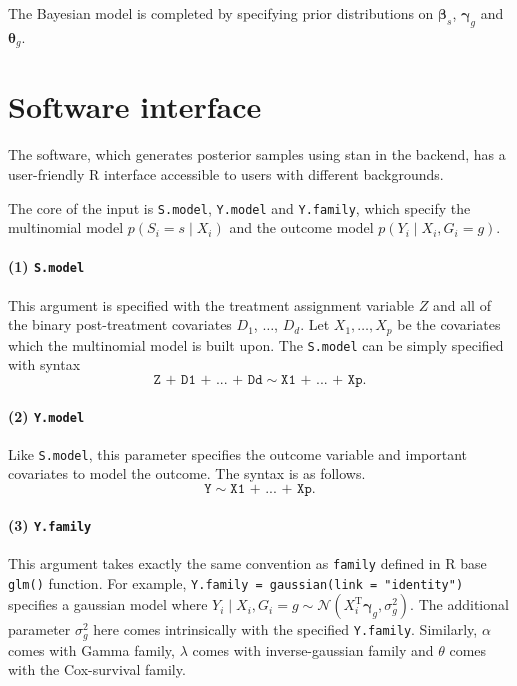 \documentclass{article}
\begin{document}
The Bayesian model is completed by specifying prior distributions on $\boldsymbol{\beta}_s$, $\boldsymbol{\gamma}_g$ and $\boldsymbol{\theta}_g$.

\section{Software interface}

The software, which generates posterior samples using stan in the backend, has a user-friendly \textsf{R} interface accessible to users with different backgrounds.

The core of the input is \texttt{S.model}, \texttt{Y.model} and \texttt{Y.family}, which specify the multinomial model $p(S_i = s\mid X_i)$ and the outcome model $p(Y_i\mid X_i, G_i = g)$. 

\paragraph{(1) \texttt{S.model}}

This argument is specified with the treatment assignment variable $Z$ and all of the binary post-treatment covariates $D_1$, $\dots$, $D_d$. Let $X_1, \dots, X_p$ be the covariates which the multinomial model is built upon. The \texttt{S.model} can be simply specified with syntax $$\texttt{Z + D1 + ... + Dd}\sim \texttt{X1 + ... + Xp}.$$

\paragraph{(2) \texttt{Y.model}}

Like \texttt{S.model}, this parameter specifies the outcome variable and important covariates to model the outcome. The syntax is as follows. $$\texttt{Y} \sim \texttt{X1 + ... + Xp}.$$

\paragraph{(3) \texttt{Y.family}}

This argument takes exactly the same convention as \texttt{family} defined in \textsf{R} base \texttt{glm()} function. For example, \texttt{Y.family = gaussian(link = "identity")} specifies a gaussian model where $Y_i\mid X_i, G_i = g \sim \mathcal{N}(X_i^\mathrm{T}\boldsymbol{\gamma}_g, \sigma_g^2)$. The additional parameter $\sigma_g^2$ here comes intrinsically with the specified \texttt{Y.family}. Similarly, $\alpha$ comes with Gamma family, $\lambda$ comes with inverse-gaussian family and $\theta$ comes with the Cox-survival family.
\end{document}
